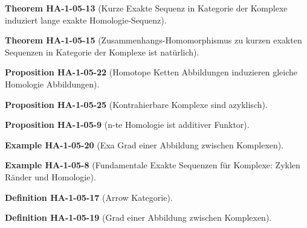 \documentclass[10pt, letterpaper]{article}
\newcommand{\CustomHeading}[3]{%
  \par\medskip\noindent%
  \textbf{#1 #2} \textnormal{(#3)}.\enskip%
}
\newenvironment{DEF}[2]{\CustomHeading{Definition}{#1}{#2}}{}
\newenvironment{PROP}[2]{\CustomHeading{Proposition}{#1}{#2}}{}
\newenvironment{THEO}[2]{\CustomHeading{Theorem}{#1}{#2}}{}
\newenvironment{EXA}[2]{\CustomHeading{Example}{#1}{#2}}{}
\begin{document}
\begin{THEO}{HA-1-05-13}{Kurze Exakte Sequenz in Kategorie der Komplexe induziert lange exakte Homologie-Sequenz}

\end{THEO}

\begin{THEO}{HA-1-05-15}{Zusammenhangs-Homomorphismus zu kurzen exakten Sequenzen in Kategorie der Komplexe ist natürlich}

\end{THEO}









\begin{PROP}{HA-1-05-22}{Homotope Ketten Abbildungen induzieren gleiche Homologie Abbildungen}

\end{PROP}

\begin{PROP}{HA-1-05-25}{Kontrahierbare Komplexe sind azyklisch}

\end{PROP}

\begin{PROP}{HA-1-05-9}{n-te Homologie ist additiver Funktor}

\end{PROP}









\begin{EXA}{HA-1-05-20}{Exa Grad einer Abbildung zwischen Komplexen}

\end{EXA}

\begin{EXA}{HA-1-05-8}{Fundamentale Exakte Sequenzen für Komplexe: Zyklen Ränder und Homologie}

\end{EXA}







\begin{DEF}{HA-1-05-17}{Arrow Kategorie}

\end{DEF}

\begin{DEF}{HA-1-05-19}{Grad einer Abbildung zwischen Komplexen}

\end{DEF}
\end{document}

